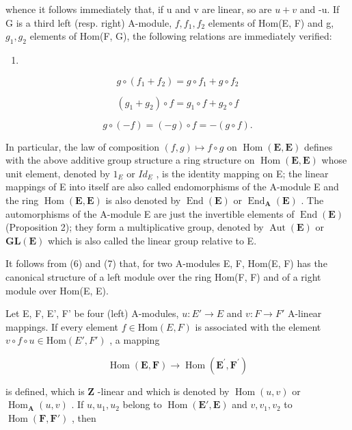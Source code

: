 whence it follows immediately that, if u and v are linear, so are \(u + v\) and -u. If G is a third left (resp. right) A-module, \(f, f_{1}, f_{2}\) elements of Hom(E, F) and g, \(g_{1}, g_{2}\) elements of Hom(F, G), the following relations are immediately verified:

\begin{enumerate}
\def\labelenumi{(\arabic{enumi})}
\setcounter{enumi}{5}
\tightlist
\item
\end{enumerate}

\[
g \circ (f _ {1} + f _ {2}) = g \circ f _ {1} + g \circ f _ {2}\tag{7}
\]

\[
\left(g _ {1} + g _ {2}\right) \circ f = g _ {1} \circ f + g _ {2} \circ f\tag{8}
\]

\[
g \circ (- f) = (- g) \circ f = - (g \circ f).
\]

In particular, the law of composition \((f,g)\mapsto f\circ g\) on \(\operatorname{Hom}(\mathbf{E},\mathbf{E})\) defines with the above additive group structure a ring structure on \(\operatorname{Hom}(\mathbf{E},\mathbf{E})\) whose unit element, denoted by \(1_{E}\) or \(Id_{E}\) , is the identity mapping on E; the linear mappings of E into itself are also called endomorphisms of the A-module E and the ring \(\operatorname{Hom}(\mathbf{E},\mathbf{E})\) is also denoted by \(\operatorname{End}(\mathbf{E})\) or \(\operatorname{End}_{\mathbf{A}}(\mathbf{E})\) . The automorphisms of the A-module E are just the invertible elements of \(\operatorname{End}(\mathbf{E})\) (Proposition 2); they form a multiplicative group, denoted by \(\operatorname{Aut}(\mathbf{E})\) or \(\mathbf{GL}(\mathbf{E})\) which is also called the linear group relative to E.

It follows from (6) and (7) that, for two A-modules E, F, Hom(E, F) has the canonical structure of a left module over the ring Hom(F, F) and of a right module over Hom(E, E).

Let E, F, E', F' be four (left) A-modules, \(u: E' \to E\) and \(v: F \to F'\) A-linear mappings. If every element \(f \in \text{Hom}(E, F)\) is associated with the element \(v \circ f \circ u \in \text{Hom}(E', F')\) , a mapping

\[
\operatorname{Hom} (\mathbf {E}, \mathbf {F}) \rightarrow \operatorname{Hom} (\mathbf {E} ^ {\prime}, \mathbf {F} ^ {\prime})
\]

is defined, which is \(\mathbf{Z}\) -linear and which is denoted by \(\operatorname{Hom}(u,v)\) or \(\operatorname{Hom}_{\mathbf{A}}(u,v)\) . If \(u, u_1, u_2\) belong to \(\operatorname{Hom}(\mathbf{E}', \mathbf{E})\) and \(v, v_1, v_2\) to \(\operatorname{Hom}(\mathbf{F}, \mathbf{F}')\) , then

